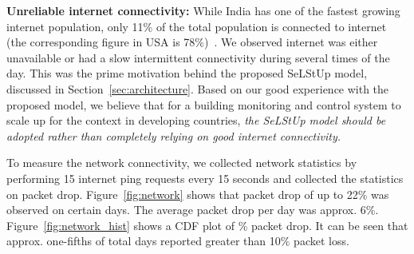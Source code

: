 \documentclass[10pt]{sensys-proc}
\newcommand{\figref}[1]{Figure~\ref{#1}}
\newcommand{\secref}[1]{Section~\ref{#1}}
\newcommand{\paradigms}{Sense-Local Store-Upload~}
\newcommand{\selstups}{SeLStUp }
\begin{document}
\noindent \textbf{Unreliable internet connectivity:} While India has one of the fastest growing internet population, only 11\% of the total population is connected to internet (the corresponding figure in USA is 78\%)~\cite{meyer}. %
We observed internet was either unavailable or had a slow intermittent connectivity during several times of the day. This was the prime motivation behind the proposed \selstups model, discussed in \secref{sec:architecture}. Based on our good experience with the proposed model, we believe that for a building monitoring and control system to scale up for the context in developing countries, \emph{the \selstups model should be adopted rather than completely relying on good internet connectivity.} %

\noindent To measure the network connectivity, we collected network statistics by performing 15 internet ping requests every 15 seconds and collected the statistics on packet drop. \figref{fig:network} shows that packet drop of up to 22\% was observed on certain days. The average packet drop per day was approx. 6\%. \figref{fig:network_hist} shows a CDF plot of \% packet drop. It can be seen that approx. one-fifths of total days reported greater than 10\% packet loss. 
\end{document}
